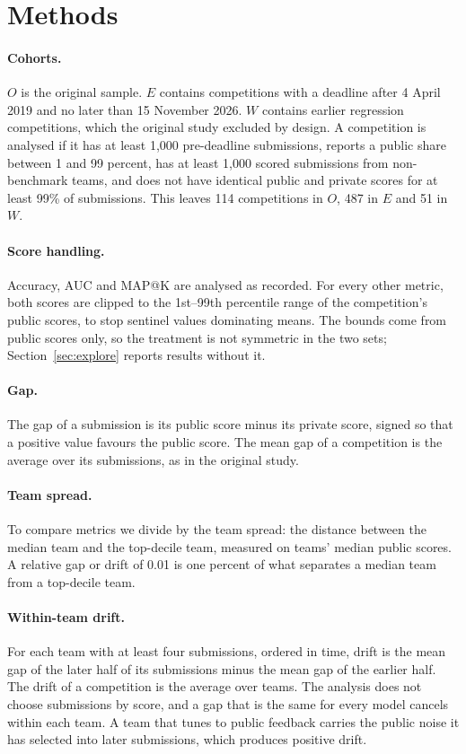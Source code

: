 \documentclass[10pt]{article}
\begin{document}
\section{Methods}
\label{sec:methods}

\paragraph{Cohorts.} $O$ is the original sample. $E$ contains competitions with a deadline after 4 April 2019 and no later than 15 November 2026. $W$ contains earlier regression competitions, which the original study excluded by design. A competition is analysed if it has at least 1,000 pre-deadline submissions, reports a public share between 1 and 99 percent, has at least 1,000 scored submissions from non-benchmark teams, and does not have identical public and private scores for at least 99\% of submissions. This leaves 114 competitions in $O$, 487 in $E$ and 51 in $W$.

\paragraph{Score handling.} Accuracy, AUC and MAP@K are analysed as recorded. For every other metric, both scores are clipped to the 1st--99th percentile range of the competition's public scores, to stop sentinel values dominating means. The bounds come from public scores only, so the treatment is not symmetric in the two sets; Section~\ref{sec:explore} reports results without it.

\paragraph{Gap.} The gap of a submission is its public score minus its private score, signed so that a positive value favours the public score. The mean gap of a competition is the average over its submissions, as in the original study.

\paragraph{Team spread.} To compare metrics we divide by the team spread: the distance between the median team and the top-decile team, measured on teams' median public scores. A relative gap or drift of 0.01 is one percent of what separates a median team from a top-decile team.

\paragraph{Within-team drift.} For each team with at least four submissions, ordered in time, drift is the mean gap of the later half of its submissions minus the mean gap of the earlier half. The drift of a competition is the average over teams. The analysis does not choose submissions by score, and a gap that is the same for every model cancels within each team. A team that tunes to public feedback carries the public noise it has selected into later submissions, which produces positive drift.
\end{document}
